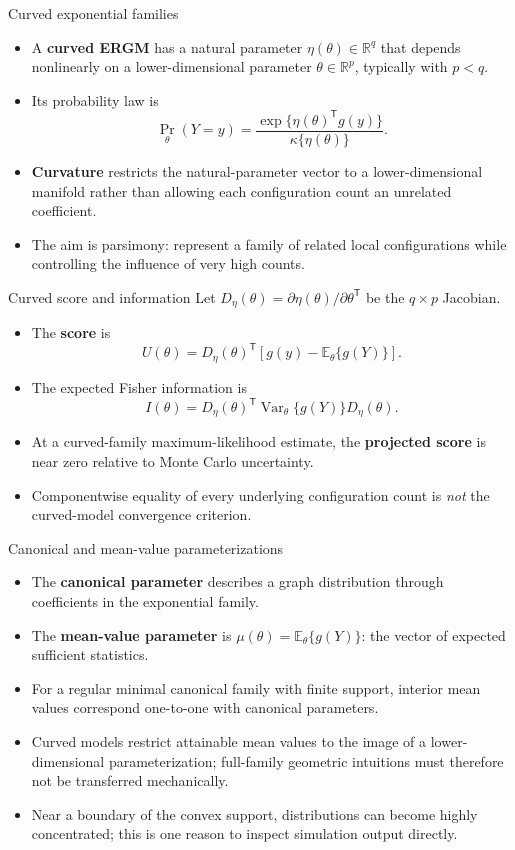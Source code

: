 \documentclass[aspectratio=169,11pt]{beamer}
\newcommand{\E}{\mathbb{E}}
\newcommand{\Var}{\operatorname{Var}}
\newcommand{\R}{\mathbb{R}}
\newcommand{\term}[1]{\textbf{\color{nupurple}#1}}
\begin{document}
\begin{frame}{Curved exponential families}
\begin{itemize}
\item A \term{curved ERGM} has a natural parameter $\eta(\theta)\in\R^q$ that depends nonlinearly on a lower-dimensional parameter $\theta\in\R^p$, typically with $p<q$.
\item Its probability law is
\[
\Pr_{\theta}(Y=y)=\frac{\exp\{\eta(\theta)^{\mathsf T}g(y)\}}{\kappa\{\eta(\theta)\}}.
\]
\item \term{Curvature} restricts the natural-parameter vector to a lower-dimensional manifold rather than allowing each configuration count an unrelated coefficient.
\item The aim is parsimony: represent a family of related local configurations while controlling the influence of very high counts.
\end{itemize}
\end{frame}

\begin{frame}{Curved score and information}
Let $D_{\eta}(\theta)=\partial\eta(\theta)/\partial\theta^{\mathsf T}$ be the $q\times p$ Jacobian.
\begin{itemize}
\item The \term{score} is
\[
U(\theta)=D_{\eta}(\theta)^{\mathsf T}\left[g(y)-\E_{\theta}\{g(Y)\}\right].
\]
\item The expected Fisher information is
\[
I(\theta)=D_{\eta}(\theta)^{\mathsf T}\Var_{\theta}\{g(Y)\}D_{\eta}(\theta).
\]
\item At a curved-family maximum-likelihood estimate, the \term{projected score} is near zero relative to Monte Carlo uncertainty.
\item Componentwise equality of every underlying configuration count is \emph{not} the curved-model convergence criterion.
\end{itemize}
\end{frame}

\begin{frame}{Canonical and mean-value parameterizations}
\begin{itemize}
\item The \term{canonical parameter} describes a graph distribution through coefficients in the exponential family.
\item The \term{mean-value parameter} is $\mu(\theta)=\E_{\theta}\{g(Y)\}$: the vector of expected sufficient statistics.
\item For a regular minimal canonical family with finite support, interior mean values correspond one-to-one with canonical parameters.
\item Curved models restrict attainable mean values to the image of a lower-dimensional parameterization; full-family geometric intuitions must therefore not be transferred mechanically.
\item Near a boundary of the convex support, distributions can become highly concentrated; this is one reason to inspect simulation output directly.
\end{itemize}
\end{frame}
\end{document}
